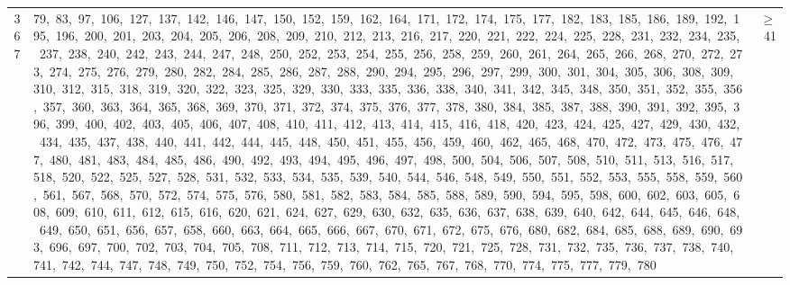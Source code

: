 \begin{longtable}{c|p{}|r}
367 & 79,\ 83,\ 97,\ 106,\ 127,\ 137,\ 142,\ 146,\ 147,\ 150,\ 152,\ 159,\ 162,\ 164,\ 171,\ 172,\ 174,\ 175,\ 177,\ 182,\ 183,\ 185,\ 186,\ 189,\ 192,\ 195,\ 196,\ 200,\ 201,\ 203,\ 204,\ 205,\ 206,\ 208,\ 209,\ 210,\ 212,\ 213,\ 216,\ 217,\ 220,\ 221,\ 222,\ 224,\ 225,\ 228,\ 231,\ 232,\ 234,\ 235,\ 237,\ 238,\ 240,\ 242,\ 243,\ 244,\ 247,\ 248,\ 250,\ 252,\ 253,\ 254,\ 255,\ 256,\ 258,\ 259,\ 260,\ 261,\ 264,\ 265,\ 266,\ 268,\ 270,\ 272,\ 273,\ 274,\ 275,\ 276,\ 279,\ 280,\ 282,\ 284,\ 285,\ 286,\ 287,\ 288,\ 290,\ 294,\ 295,\ 296,\ 297,\ 299,\ 300,\ 301,\ 304,\ 305,\ 306,\ 308,\ 309,\ 310,\ 312,\ 315,\ 318,\ 319,\ 320,\ 322,\ 323,\ 325,\ 329,\ 330,\ 333,\ 335,\ 336,\ 338,\ 340,\ 341,\ 342,\ 345,\ 348,\ 350,\ 351,\ 352,\ 355,\ 356,\ 357,\ 360,\ 363,\ 364,\ 365,\ 368,\ 369,\ 370,\ 371,\ 372,\ 374,\ 375,\ 376,\ 377,\ 378,\ 380,\ 384,\ 385,\ 387,\ 388,\ 390,\ 391,\ 392,\ 395,\ 396,\ 399,\ 400,\ 402,\ 403,\ 405,\ 406,\ 407,\ 408,\ 410,\ 411,\ 412,\ 413,\ 414,\ 415,\ 416,\ 418,\ 420,\ 423,\ 424,\ 425,\ 427,\ 429,\ 430,\ 432,\ 434,\ 435,\ 437,\ 438,\ 440,\ 441,\ 442,\ 444,\ 445,\ 448,\ 450,\ 451,\ 455,\ 456,\ 459,\ 460,\ 462,\ 465,\ 468,\ 470,\ 472,\ 473,\ 475,\ 476,\ 477,\ 480,\ 481,\ 483,\ 484,\ 485,\ 486,\ 490,\ 492,\ 493,\ 494,\ 495,\ 496,\ 497,\ 498,\ 500,\ 504,\ 506,\ 507,\ 508,\ 510,\ 511,\ 513,\ 516,\ 517,\ 518,\ 520,\ 522,\ 525,\ 527,\ 528,\ 531,\ 532,\ 533,\ 534,\ 535,\ 539,\ 540,\ 544,\ 546,\ 548,\ 549,\ 550,\ 551,\ 552,\ 553,\ 555,\ 558,\ 559,\ 560,\ 561,\ 567,\ 568,\ 570,\ 572,\ 574,\ 575,\ 576,\ 580,\ 581,\ 582,\ 583,\ 584,\ 585,\ 588,\ 589,\ 590,\ 594,\ 595,\ 598,\ 600,\ 602,\ 603,\ 605,\ 608,\ 609,\ 610,\ 611,\ 612,\ 615,\ 616,\ 620,\ 621,\ 624,\ 627,\ 629,\ 630,\ 632,\ 635,\ 636,\ 637,\ 638,\ 639,\ 640,\ 642,\ 644,\ 645,\ 646,\ 648,\ 649,\ 650,\ 651,\ 656,\ 657,\ 658,\ 660,\ 663,\ 664,\ 665,\ 666,\ 667,\ 670,\ 671,\ 672,\ 675,\ 676,\ 680,\ 682,\ 684,\ 685,\ 688,\ 689,\ 690,\ 693,\ 696,\ 697,\ 700,\ 702,\ 703,\ 704,\ 705,\ 708,\ 711,\ 712,\ 713,\ 714,\ 715,\ 720,\ 721,\ 725,\ 728,\ 731,\ 732,\ 735,\ 736,\ 737,\ 738,\ 740,\ 741,\ 742,\ 744,\ 747,\ 748,\ 749,\ 750,\ 752,\ 754,\ 756,\ 759,\ 760,\ 762,\ 765,\ 767,\ 768,\ 770,\ 774,\ 775,\ 777,\ 779,\ 780 & $\ge$ 41 \\

\end{longtable}
